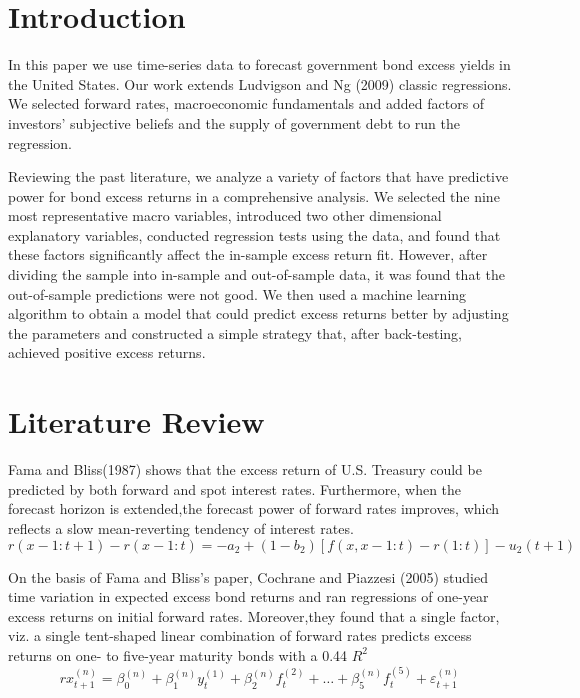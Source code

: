 \documentclass[12pt]{article}
\begin{document}
\newpage

\tableofcontents

\newpage

\section{Introduction}
\indent In this paper we use time-series data to forecast government bond excess yields in the United States. Our work extends Ludvigson and Ng (2009)\cite{ludvigson2009macro} classic regressions. We selected forward rates, macroeconomic fundamentals and added factors of investors' subjective beliefs and the supply of government debt to run the regression. 

Reviewing the past literature, we analyze a variety of factors that have predictive power for bond excess returns in a comprehensive analysis. We selected the nine most representative macro variables, introduced two other dimensional explanatory variables, conducted regression tests using the data, and found that these factors significantly affect the in-sample excess return fit. However, after dividing the sample into in-sample and out-of-sample data, it was found that the out-of-sample predictions were not good. We then used a machine learning algorithm to obtain a model that could predict excess returns better by adjusting the parameters and constructed a simple strategy that, after back-testing, achieved positive excess returns.

\section{Literature Review}
\indent Fama and Bliss(1987)\cite{fama1987information} shows that the excess return of U.S. Treasury could be predicted by both forward and spot interest rates. Furthermore, when the forecast horizon is extended,the forecast power of forward rates improves, which reflects a slow mean-reverting tendency of interest rates.
$$
r(x-1:t+1)-r(x-1:t)=-a_2+(1-b_2)[f(x,x-1:t)-r(1:t)]-u_2(t+1)
$$

On the basis of Fama and Bliss's paper, Cochrane and Piazzesi (2005)\cite{cochrane2005bond} studied time variation in expected excess bond returns and ran regressions of one-year excess returns on initial forward rates. Moreover,they found that a single factor, viz. a single tent-shaped linear combination of forward rates predicts excess returns on one- to five-year maturity bonds with a 0.44 $R^2$
$$
rx^{(n)}_{t+1}=\beta^{(n)}_{0}+\beta^{(n)}_{1}y^{(1)}_{t}+\beta^{(n)}_{2}f^{(2)}_{t}+\ldots+\beta^{(n)}_{5}f^{(5)}_{t}+\varepsilon^{(n)}_{t+1}
$$
\end{document}
